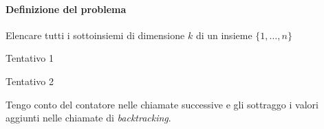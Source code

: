 \newpage
\paragraph{Definizione del problema}
Elencare tutti i sottoinsiemi di dimensione \(k\) di un insieme \(\{1, \dots, n\}\)

\begin{minipage}[t]{.5\linewidth}
	\begin{algorithm}[H]
	\caption{Tentativo 1}


	\end{algorithm}
\end{minipage}
\begin{minipage}[t]{.5\linewidth}
	\begin{algorithm}[H]
	\caption{Tentativo 2}


	\end{algorithm}
	\vspace{-10pt}
	Tengo conto del contatore nelle chiamate successive e gli sottraggo i valori aggiunti nelle chiamate di \emph{backtracking}.
\end{minipage}

